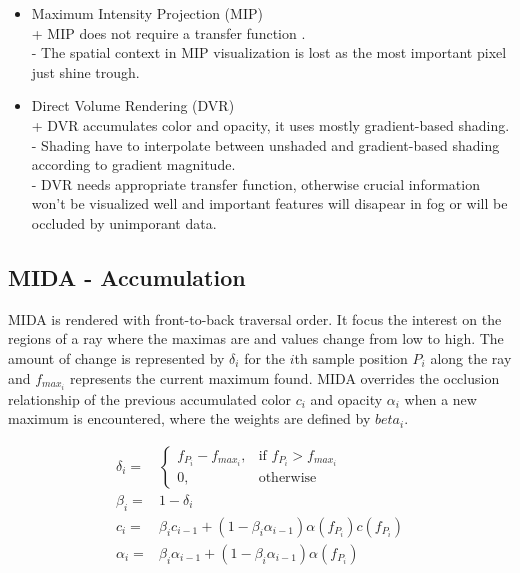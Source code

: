 \begin{itemize}
\item Maximum Intensity Projection (MIP) \\
+ MIP does not require a transfer function .\\
- The spatial context in MIP visualization is lost as the most important pixel just shine trough. \\
\item Direct Volume Rendering (DVR)\\
+ DVR accumulates color and opacity, it uses mostly gradient-based shading. \\
- Shading have to interpolate between unshaded and gradient-based shading according to gradient magnitude. \\ 
- DVR needs appropriate transfer function, otherwise crucial information won't be visualized well 
  and important features will disapear in fog or will be occluded by unimporant data.
\end{itemize}

\subsection{MIDA - Accumulation}
\label{sec:Accumulation}

MIDA is rendered with front-to-back traversal order.  
It focus the interest on the regions of a ray where the maximas are and values change from low to high. The amount of change is represented by $\delta_i$ for the $i$th sample position $P_i$ along the ray and $f_{max_i}$ represents the current maximum found.
MIDA overrides the occlusion relationship of the previous accumulated color $c_i$ and opacity $\alpha_i$ when a new maximum is encountered, where the weights are defined by $beta_i$.

\begin{eqnarray}
\delta_i = & \begin{cases}
f_{P_i} - f_{max_i}, & \text{if $f_{P_i} > f_{max_i}$}\\
0, & \text{otherwise}
\end{cases} \\
\beta_i = & 1 - \delta_i \\
c_i = & \beta_i c_{i-1} + (1 - \beta_i \alpha_{i-1}) \alpha(f_{P_i})c(f_{P_i}) \\
\alpha_i = & \beta_i \alpha_{i-1} + (1 - \beta_i \alpha_{i-1}) \alpha(f_{P_i}) 
\label{eqn:MIDA}
\end{eqnarray}

